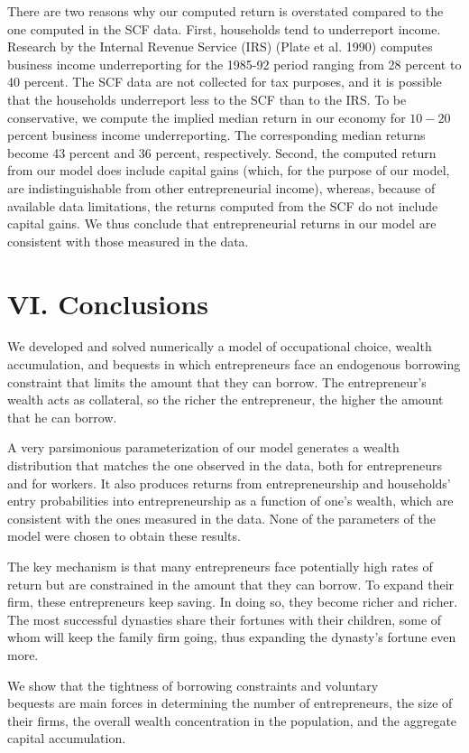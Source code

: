 \documentclass[10pt]{article}
\begin{document}
There are two reasons why our computed return is overstated compared to the one computed in the SCF data. First, households tend to underreport income. Research by the Internal Revenue Service (IRS) (Plate et al. 1990) computes business income underreporting for the 1985-92 period ranging from 28 percent to 40 percent. The SCF data are not collected for tax purposes, and it is possible that the households underreport less to the SCF than to the IRS. To be conservative, we compute the implied median return in our economy for $10-20$ percent business income underreporting. The corresponding median returns become 43 percent and 36 percent, respectively. Second, the computed return from our model does include capital gains (which, for the purpose of our model, are indistinguishable from other entrepreneurial income), whereas, because of available data limitations, the returns computed from the SCF do not include capital gains. We thus conclude that entrepreneurial returns in our model are consistent with those measured in the data.

\section*{VI. Conclusions}
We developed and solved numerically a model of occupational choice, wealth accumulation, and bequests in which entrepreneurs face an endogenous borrowing constraint that limits the amount that they can borrow. The entrepreneur's wealth acts as collateral, so the richer the entrepreneur, the higher the amount that he can borrow.

A very parsimonious parameterization of our model generates a wealth distribution that matches the one observed in the data, both for entrepreneurs and for workers. It also produces returns from entrepreneurship and households' entry probabilities into entrepreneurship as a function of one's wealth, which are consistent with the ones measured in the data. None of the parameters of the model were chosen to obtain these results.

The key mechanism is that many entrepreneurs face potentially high rates of return but are constrained in the amount that they can borrow. To expand their firm, these entrepreneurs keep saving. In doing so, they become richer and richer. The most successful dynasties share their fortunes with their children, some of whom will keep the family firm going, thus expanding the dynasty's fortune even more.

We show that the tightness of borrowing constraints and voluntary\\
bequests are main forces in determining the number of entrepreneurs, the size of their firms, the overall wealth concentration in the population, and the aggregate capital accumulation.
\end{document}
